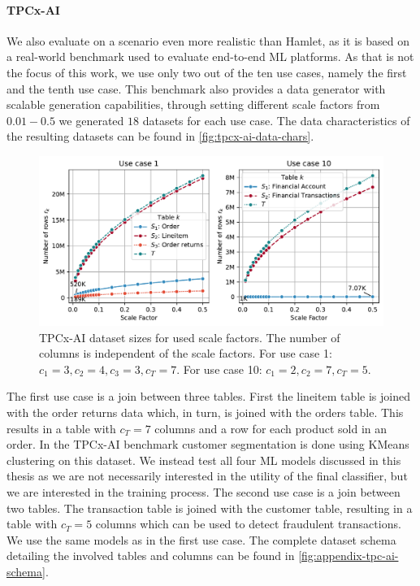 \paragraph{TPCx-AI \cite{tpcx-ai}} We also evaluate on a scenario even more realistic than Hamlet, as it is based on a real-world benchmark used to evaluate end-to-end ML platforms. As that is not the focus of this work, we use only two out of the ten use cases, namely the first and the tenth use case. This benchmark also provides a data generator with scalable generation capabilities, through setting different scale factors from $0.01-0.5$ we generated $18$ datasets for each use case. The data characteristics of the resulting datasets can be found in \autoref{fig:tpcx-ai-data-chars}.
\begin{figure}
    \centering
    \includegraphics[width=\linewidth]{chapters/06_evaluation/figures/tpcx-ai-data-chars.pdf}
    \caption[TPCx-AI dataset sizes for used scale factors.]{TPCx-AI dataset sizes for used scale factors. The number of columns is independent of the scale factors. For use case 1: $c_1=3, c_2=4, c_3=3, c_T=7$. For use case 10: $c_1=2, c_2=7, c_T=5$.}
    \label{fig:tpcx-ai-data-chars}
\end{figure}

The first use case is a join between three tables. First the lineitem table is joined with the order returns data which, in turn, is joined with the orders table. This results in a table with $c_T=7$ columns and a row for each product sold in an order. In the TPCx-AI benchmark customer segmentation is done using KMeans clustering on this dataset. We instead test all four ML models discussed in this thesis as we are not necessarily interested in the utility of the final classifier, but we are interested in the training process. The second use case is a join between two tables. The transaction table is joined with the customer table, resulting in a table with $c_T=5$ columns which can be used to detect fraudulent transactions. We use the same models as in the first use case. The complete dataset schema detailing the involved tables and columns can be found in \autoref{fig:appendix-tpc-ai-schema}.



